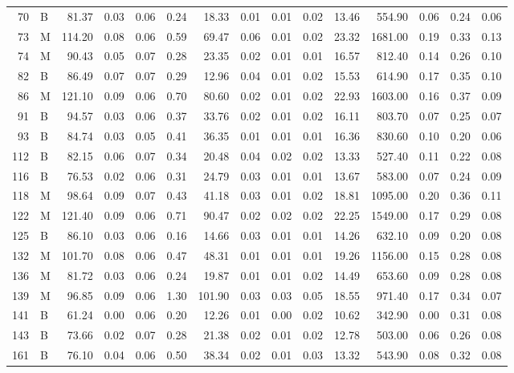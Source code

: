 \begin{table}[ht]
\begin{tabular}{rlrrrrrrrrrrrrr}
  70 & B & 81.37 & 0.03 & 0.06 & 0.24 & 18.33 & 0.01 & 0.01 & 0.02 & 13.46 & 554.90 & 0.06 & 0.24 & 0.06 \\ 
  73 & M & 114.20 & 0.08 & 0.06 & 0.59 & 69.47 & 0.06 & 0.01 & 0.02 & 23.32 & 1681.00 & 0.19 & 0.33 & 0.13 \\ 
  74 & M & 90.43 & 0.05 & 0.07 & 0.28 & 23.35 & 0.02 & 0.01 & 0.01 & 16.57 & 812.40 & 0.14 & 0.26 & 0.10 \\ 
  82 & B & 86.49 & 0.07 & 0.07 & 0.29 & 12.96 & 0.04 & 0.01 & 0.02 & 15.53 & 614.90 & 0.17 & 0.35 & 0.10 \\ 
  86 & M & 121.10 & 0.09 & 0.06 & 0.70 & 80.60 & 0.02 & 0.01 & 0.02 & 22.93 & 1603.00 & 0.16 & 0.37 & 0.09 \\ 
  91 & B & 94.57 & 0.03 & 0.06 & 0.37 & 33.76 & 0.02 & 0.01 & 0.02 & 16.11 & 803.70 & 0.07 & 0.25 & 0.07 \\ 
  93 & B & 84.74 & 0.03 & 0.05 & 0.41 & 36.35 & 0.01 & 0.01 & 0.01 & 16.36 & 830.60 & 0.10 & 0.20 & 0.06 \\ 
  112 & B & 82.15 & 0.06 & 0.07 & 0.34 & 20.48 & 0.04 & 0.02 & 0.02 & 13.33 & 527.40 & 0.11 & 0.22 & 0.08 \\ 
  116 & B & 76.53 & 0.02 & 0.06 & 0.31 & 24.79 & 0.03 & 0.01 & 0.01 & 13.67 & 583.00 & 0.07 & 0.24 & 0.09 \\ 
  118 & M & 98.64 & 0.09 & 0.07 & 0.43 & 41.18 & 0.03 & 0.01 & 0.02 & 18.81 & 1095.00 & 0.20 & 0.36 & 0.11 \\ 
  122 & M & 121.40 & 0.09 & 0.06 & 0.71 & 90.47 & 0.02 & 0.02 & 0.02 & 22.25 & 1549.00 & 0.17 & 0.29 & 0.08 \\ 
  125 & B & 86.10 & 0.03 & 0.06 & 0.16 & 14.66 & 0.03 & 0.01 & 0.01 & 14.26 & 632.10 & 0.09 & 0.20 & 0.08 \\ 
  132 & M & 101.70 & 0.08 & 0.06 & 0.47 & 48.31 & 0.01 & 0.01 & 0.01 & 19.26 & 1156.00 & 0.15 & 0.28 & 0.08 \\ 
  136 & M & 81.72 & 0.03 & 0.06 & 0.24 & 19.87 & 0.01 & 0.01 & 0.02 & 14.49 & 653.60 & 0.09 & 0.28 & 0.08 \\ 
  139 & M & 96.85 & 0.09 & 0.06 & 1.30 & 101.90 & 0.03 & 0.03 & 0.05 & 18.55 & 971.40 & 0.17 & 0.34 & 0.07 \\ 
  141 & B & 61.24 & 0.00 & 0.06 & 0.20 & 12.26 & 0.01 & 0.00 & 0.02 & 10.62 & 342.90 & 0.00 & 0.31 & 0.08 \\ 
  143 & B & 73.66 & 0.02 & 0.07 & 0.28 & 21.38 & 0.02 & 0.01 & 0.02 & 12.78 & 503.00 & 0.06 & 0.26 & 0.08 \\ 
  161 & B & 76.10 & 0.04 & 0.06 & 0.50 & 38.34 & 0.02 & 0.01 & 0.03 & 13.32 & 543.90 & 0.08 & 0.32 & 0.08 \\ 

\end{tabular}
\end{table}
